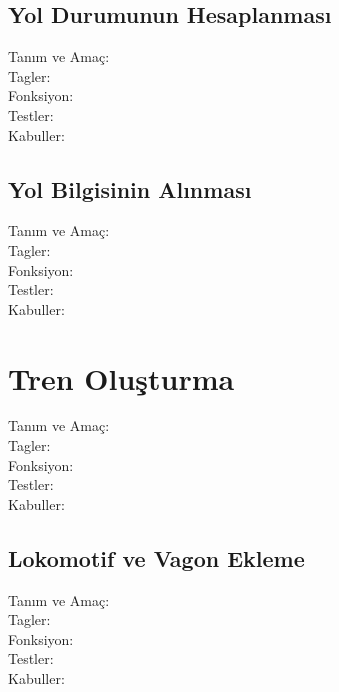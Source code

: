 \documentclass[10pt,a4paper]{article}
\begin{document}
\subsection{Yol Durumunun Hesaplanması}
\begin{description}
\item[Tanım ve Amaç:] 
\item[Tagler:]
\item[Fonksiyon:]
\item[Testler:]
\item[Kabuller:]
\end{description}
\newpage

\subsection{Yol Bilgisinin Alınması}
\begin{description}
\item[Tanım ve Amaç:] 
\item[Tagler:]
\item[Fonksiyon:]
\item[Testler:]
\item[Kabuller:]
\end{description}

\newpage

\section{Tren Oluşturma}
\begin{description}
\item[Tanım ve Amaç:] 
\item[Tagler:]
\item[Fonksiyon:]
\item[Testler:]
\item[Kabuller:]
\end{description}
\newpage

\subsection{Lokomotif ve Vagon Ekleme}
\begin{description}
\item[Tanım ve Amaç:] 
\item[Tagler:]
\item[Fonksiyon:]
\item[Testler:]
\item[Kabuller:]
\end{description}
\newpage
\end{document}
